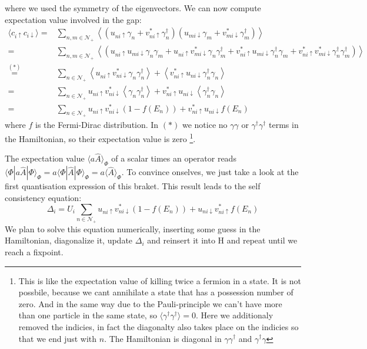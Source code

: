 \documentclass[../main.tex]{subfile}
\begin{document}
where we used the symmetry of the eigenvectors. We can now compute expectation value involved in the gap:
\begin{align*}
    \langle c_{i\uparrow}c_{i\downarrow} \rangle =& \sum_{n,m\in\mathcal{N}_+} \left\langle\left(u_{ni\uparrow}\gamma_n + v_{ni\uparrow}^{\ast}\gamma_{n}^{\dagger}\right)\left(u_{mi\downarrow}\gamma_m + v_{mi\downarrow}^{\ast}\gamma_{m}^{\dagger}\right)\right\rangle\\
     =&  \sum_{n,m\in\mathcal{N}_+} \left\langle\left(u_{ni\uparrow} u_{mi\downarrow}\gamma_n\gamma_m + u_{ni\uparrow} v_{mi\downarrow}^{\ast}\gamma_n\gamma_{m}^{\dagger} + v_{ni\uparrow}^{\ast}u_{mi\downarrow}\gamma_{n}^{\dagger} \gamma_m+  v_{ni\uparrow}^{\ast} v_{mi\downarrow}^{\ast}\gamma_{n}^{\dagger}\gamma_{m}^{\dagger}  \right)\right\rangle\\
     \stackrel{(\ast)}{=}&  \sum_{n\in\mathcal{N}_+} \left\langle u_{ni\uparrow} v_{ni\downarrow}^{\ast}\gamma_n\gamma_{n}^{\dagger}\right\rangle + \left\langle v_{ni\uparrow}^{\ast}u_{ni\downarrow}\gamma_{n}^{\dagger}\gamma_{n}\right\rangle\\     
     =&  \sum_{n\in\mathcal{N}_+} u_{ni\uparrow} v_{ni\downarrow}^{\ast}\left\langle\gamma_n\gamma_{n}^{\dagger}\right\rangle + v_{ni\uparrow}^{\ast}u_{ni\downarrow}\left\langle \gamma_{n}^{\dagger}\gamma_{n}\right\rangle\\
     =&  \sum_{n\in\mathcal{N}_+} u_{ni\uparrow} v_{ni\downarrow}^{\ast} \left(1-f(E_n)\right) + v_{ni\uparrow}^{\ast}u_{ni\downarrow}f(E_n)
\end{align*}
where $f$ is the Fermi-Dirac distribution. In $(\ast)$ we notice no $\gamma\gamma$ or $\gamma^{\dagger}\gamma^{\dagger}$ terms in the Hamiltonian, so their expectation 
value is zero
\footnote{This is like the expectation value of killing twice a fermion in a state. It is not possbile, because we cant annihilate a state that has a possession number of zero.
And in the same way due to the Pauli-principle we can't have more than one particle in the same state, so $\langle \gamma^{\dagger} \gamma^{\dagger} \rangle = 0$. Here we 
additionaly removed the indicies, in fact the diagonalty also takes place on the indicies so that we end just with $n$.
The Hamiltonian is diagonal in $\gamma\gamma^{\dagger}$ and $\gamma^{\dagger}\gamma$ }.

The expectation value $\langle a\hat{A}\rangle_{\Phi}$ of a scalar times an operator reads $\langle \Phi|a \hat{A}|\Phi\rangle_{\Phi} = a \langle \Phi|\hat{A}|\Phi\rangle_{\Phi} = a \langle \hat{A}\rangle_{\Phi}$. 
To convince onselves, we just take a look at the first quantisation expression of this braket. This result leads to the self consistency equation:
\begin{equation}\label{eq:SelfConsitentDelta}
    \Delta_i = U_i\sum_{n\in\mathcal{N}_+} u_{ni\uparrow} v_{ni\downarrow}^{\ast} \left(1-f(E_n)\right) + u_{ni\downarrow} v_{ni\uparrow}^{\ast}f(E_n)
\end{equation}
We plan to solve this equation numerically, inserting some guess in the Hamiltonian, diagonalize it, update $\Delta_i$ and reinsert it into H and repeat until we reach a fixpoint.\\
\end{document}
